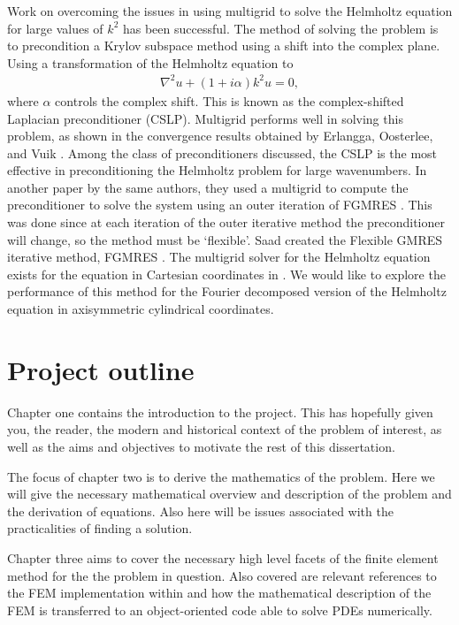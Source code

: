 Work on overcoming the issues in using multigrid to solve the Helmholtz equation for large values of $k^2$ has been successful.
The method of solving the problem is to precondition a Krylov subspace method using a shift into the complex plane.
Using a transformation of the Helmholtz equation to
\begin{align}
	\nabla^2 u + (1+i\alpha)k^2 u = 0,
\end{align}
where $\alpha$ controls the complex shift.
This is known as the complex-shifted Laplacian preconditioner (CSLP).
Multigrid performs well in solving this problem, as shown in the convergence results obtained by Erlangga, Oosterlee, and Vuik \cite{cslp1}.
Among the class of preconditioners discussed, the CSLP is the most effective in preconditioning the Helmholtz problem for large wavenumbers.
In another paper by the same authors, they used a multigrid to compute the preconditioner to solve the system using an outer iteration of FGMRES \cite{cslp2}.
This was done since at each iteration of the outer iterative method the preconditioner will change, so the method must be `flexible'.
Saad created the Flexible GMRES iterative method, FGMRES \cite{fgmres}.
The multigrid solver for the Helmholtz equation exists for the equation in Cartesian coordinates in \oomph.
We would like to explore the performance of this method for the Fourier decomposed version of the Helmholtz equation in axisymmetric cylindrical coordinates.






\section{Project outline}

Chapter one contains the introduction to the project.
This has hopefully given you, the reader, the modern and historical context of the problem of interest, as well as the aims and objectives to motivate the rest of this dissertation.

The focus of chapter two is to derive the mathematics of the problem.
Here we will give the necessary mathematical overview and description of the problem and the derivation of equations.
Also here will be issues associated with the practicalities of finding a solution.

Chapter three aims to cover the necessary high level facets of the finite element method for the the problem in question.
Also covered are relevant references to the FEM implementation within \oomph and how the mathematical description of the FEM is transferred to an object-oriented code able to solve PDEs numerically.

